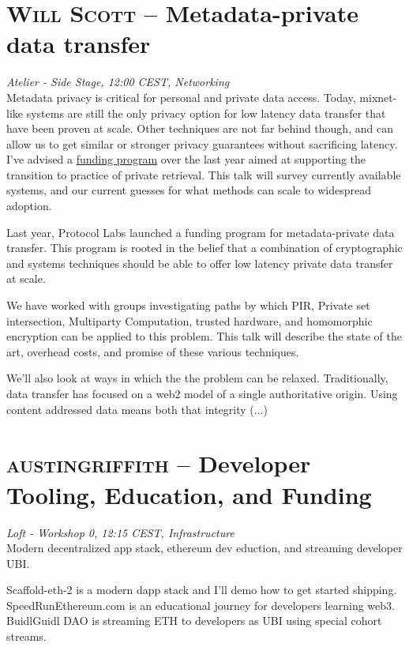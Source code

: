 \section {\textsc{Will Scott} -- Metadata-private data transfer
} \noindent \textit {Atelier - Side Stage, 12:00 CEST, Networking
}\\[1em] Metadata privacy is critical for personal and private data access. Today, mixnet-like systems are still the only privacy option for low latency data transfer that have been proven at scale. Other techniques are not far behind though, and can allow us to get similar or stronger privacy guarantees without sacrificing latency. I've advised a \href{https://research.protocol.ai/blog/2022/announcing-rfp-014-the-one-with-private-retrieval/}{funding program}
 over the last year aimed at supporting the transition to practice of private retrieval. This talk will survey currently available systems, and our current guesses for what methods can scale to widespread adoption.
\par Last year, Protocol Labs launched a funding program for metadata-private data transfer. This program is rooted in the belief that a combination of cryptographic and systems techniques should be able to offer low latency private data transfer at scale.

We have worked with groups investigating paths by which PIR, Private set intersection, Multiparty Computation, trusted hardware, and homomorphic encryption can be applied to this problem. This talk will describe the state of the art, overhead costs, and promise of these various techniques.

We'll also look at ways in which the the problem can be relaxed. Traditionally, data transfer has focused on a web2 model of a single authoritative origin. Using content addressed data means both that integrity
(...)\clearpage
\section {\textsc{austingriffith} -- Developer Tooling, Education, and Funding
} \noindent \textit {Loft - Workshop 0, 12:15 CEST, Infrastructure
}\\[1em] Modern decentralized app stack, ethereum dev eduction, and streaming developer UBI.
\par Scaffold-eth-2 is a modern dapp stack and I'll demo how to get started shipping.
SpeedRunEthereum.com is an educational journey for developers learning web3.
BuidlGuidl DAO is streaming ETH to developers as UBI using special cohort streams.
\clearpage
